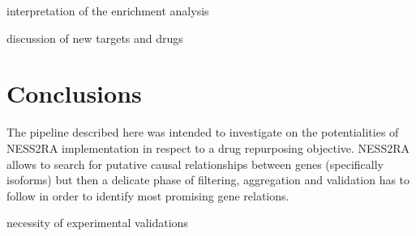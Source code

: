 \documentclass[fleqn,10pt]{SelfArx} %
\begin{document}
interpretation of the enrichment analysis

discussion of new targets and drugs

\section*{Conclusions}

The pipeline described here was intended to investigate on the potentialities of NESS2RA implementation in respect to a drug repurposing objective.
NESS2RA allows to search for putative causal relationships between genes (specifically isoforms) but then a delicate phase of filtering, aggregation and validation has to follow in order to identify most promising gene relations.

necessity of experimental validations
\end{document}
